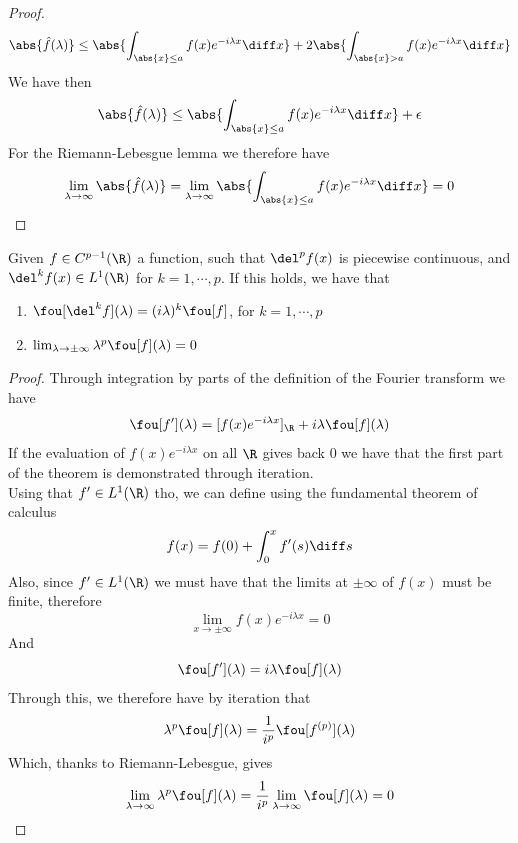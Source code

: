 \documentclass[../mmf.tex]{subfiles}
\begin{document}
\begin{proof}
\begin{equation*}
		\abs{\hat{f}(\lambda)}\le\abs{\int_{\abs{x}\le a}^{}f(x)e^{-i\lambda x}\diff x}+2\abs{\int_{\abs{x}>a}^{}f(x)e^{-i\lambda x}\diff x}
	\end{equation*}
	We have then
	\begin{equation*}
		\abs{\hat{f}(\lambda)}\le\abs{\int_{\abs{x}\le a}^{}f(x)e^{-i\lambda x}\diff x}+\epsilon
	\end{equation*}
	For the Riemann-Lebesgue lemma we therefore have
	\begin{equation*}
		\lim_{\lambda\to\infty}\abs{\hat{f}(\lambda)}=\lim_{\lambda\to\infty}\abs{\int_{\abs{x}\le a}^{}f(x)e^{-i\lambda x}\diff x}=0
	\end{equation*}
\end{proof}
\begin{thm}
	Given $f\in C^{p-1}(\R)$ a function, such that $\del^{p}f(x)$ is piecewise continuous, and $\del^k f(x)\in L^1(\R)$ for $k=1,\cdots,p$. If this holds, we have that
	\begin{enumerate}
		\item $\fou[\del^kf](\lambda)=(i\lambda)^k\fou[f]$, for $k=1,\cdots,p$
		\item $\lim_{\lambda\to\pm\infty}\lambda^p\fou[f](\lambda)=0$
	\end{enumerate}
\end{thm}
\begin{proof}
	Through integration by parts of the definition of the Fourier transform we have
	\begin{equation*}
		\fou[f'](\lambda)=[f(x)e^{-i\lambda x}]_{\R} +i\lambda\fou[f](\lambda)
	\end{equation*}
	If the evaluation of $f(x)e^{-i\lambda x}$ on all $\R$ gives back $0$ we have that the first part of the theorem is demonstrated through iteration.\\
	Using that $f'\in L^1(\R)$ tho, we can define using the fundamental theorem of calculus
	\begin{equation*}
		f(x)=f(0)+\int_{0}^{x}f'(s)\diff s
	\end{equation*}
	Also, since $f'\in L^1(\R)$ we must have that the limits at $\pm\infty$ of $f(x)$ must be finite, therefore
	\begin{equation*}
		\lim_{x\to\pm\infty}f(x)e^{-i\lambda x}=0
	\end{equation*}
	And
	\begin{equation*}
		\fou[f'](\lambda)=i\lambda\fou[f](\lambda)
	\end{equation*}
	Through this, we therefore have by iteration that
	\begin{equation*}
		\lambda^p\fou[f](\lambda)=\frac{1}{i^p}\fou[f^{(p)}](\lambda)
	\end{equation*}
	Which, thanks to Riemann-Lebesgue, gives
	\begin{equation*}
		\lim_{\lambda\to\infty}\lambda^p\fou[f](\lambda)=\frac{1}{i^p}\lim_{\lambda\to\infty}\fou[f](\lambda)=0
	\end{equation*}
\end{proof}
\end{document}
